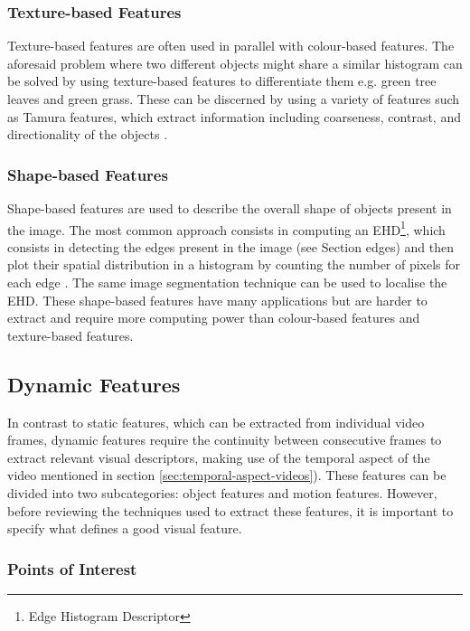 \subsubsection{Texture-based Features}

Texture-based features are often used in parallel with colour-based features. The aforesaid problem where two different objects might share a similar histogram can be solved by using texture-based features to differentiate them e.g. green tree leaves and green grass. These can be discerned by using a variety of features such as Tamura features, which extract information including coarseness, contrast, and directionality of the objects \cite{amir2003ibm}. 

\subsubsection{Shape-based Features}

Shape-based features are used to describe the overall shape of objects present in the image. The most common approach consists in computing an EHD\footnote{Edge Histogram Descriptor}, which consists in detecting the edges present in the image (see Section edges) and then plot their spatial distribution in a histogram by counting the number of pixels for each edge \cite{hauptmann2004informedia}. The same image segmentation technique can be used to localise the EHD. These shape-based features have many applications but are harder to extract and require more computing power than colour-based features and texture-based features.


\subsection{Dynamic Features}
\label{sec:dynamic-features}

In contrast to static features, which can be extracted from individual video frames, dynamic features require the continuity between consecutive frames to extract relevant visual descriptors, making use of the temporal aspect of the video mentioned in section \ref{sec:temporal-aspect-videos}). These features can be divided into two subcategories: object features and motion features. However, before reviewing the techniques used to extract these features, it is important to specify what defines a good visual feature.

\subsubsection{Points of Interest}


